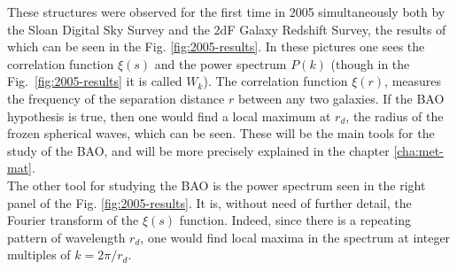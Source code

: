 These structures were observed for the first time in 2005 simultaneously both by the Sloan Digital Sky Survey\cite{Eisenstein2005} and the 2dF Galaxy Redshift Survey\cite{2dFCole2005}, the results of which can be seen in the Fig. \ref{fig:2005-results}. In these pictures one sees the correlation function  $\xi(s)$ and the power spectrum $P(k)$ (though in the Fig.~\ref{fig:2005-results} it is called $W_k$). 
The correlation function $\xi(r)$, measures the frequency of the separation distance $r$ between any two galaxies. If the BAO hypothesis is true, then one would find a local maximum at $r_d$, the radius of the frozen spherical waves, which can be seen. These will be the main tools for the study of the BAO, and will be more precisely explained in the chapter \ref{cha:met-mat}.\\

The other tool for studying the BAO is the power spectrum seen in the right panel of the Fig. \ref{fig:2005-results}. It is, without need of further detail, the Fourier transform of the $\xi(s)$ function. Indeed, since there is a repeating pattern of wavelength $r_d$, one would find local maxima in the spectrum at integer multiples of $k = 2\pi /r_d$. \\


